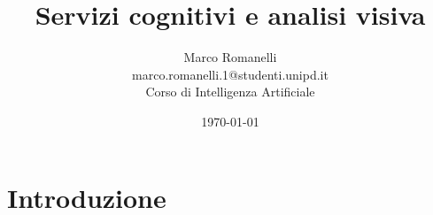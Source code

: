 \documentclass[12pt]{beamer}
\author[Romanelli,Marco]{Marco Romanelli\\[0.5\baselineskip]
\tiny marco.romanelli.1@studenti.unipd.it\\[1.5\baselineskip]
\scriptsize Corso di Intelligenza Artificiale}
\title{Servizi cognitivi e analisi visiva}
\institute{Universit\`a di Padova}
\date{\today}
\begin{document}
\section{Introduzione}\label{sec:intro}
%
%
\begin{frame}[t,plain]\titlepage\end{frame}

\setcounter{framenumber}{0} %
%
\end{document}
